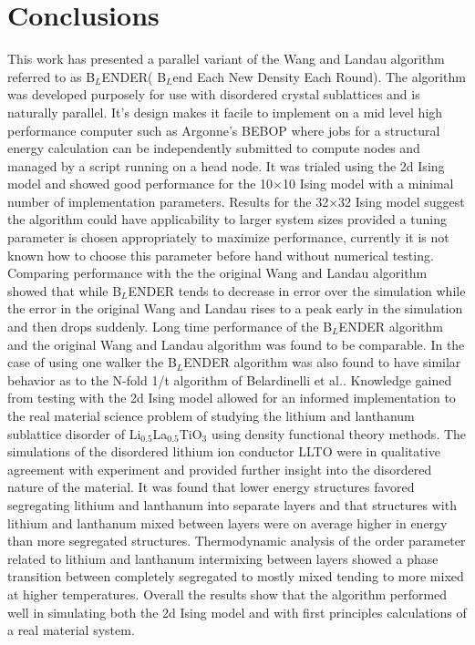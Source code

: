 \documentclass[aps,pre,reprint,superscriptaddress,showkeys]{revtex4-1}
\begin{document}
\section{Conclusions}
\label{sec5}
 This work has presented a parallel variant of the Wang and Landau algorithm referred to as B$_L$ENDER( B$_L$end Each New Density Each Round). The algorithm was developed purposely for use with disordered crystal sublattices and is naturally parallel. It's design makes it facile to implement on a mid level high performance computer such as Argonne's BEBOP where jobs for a structural energy calculation can be independently submitted to compute nodes  and managed by a script running on a head node. It was trialed using the 2d Ising model and showed good performance for the 10$\times$10 Ising model with a minimal number of implementation parameters. Results for the 32$\times$32 Ising model suggest the algorithm could have applicability to larger system sizes provided a tuning parameter is chosen appropriately to maximize performance, currently it is not known how to choose this parameter before hand without numerical testing. Comparing performance with the the original Wang and Landau algorithm showed that while B$_L$ENDER tends to decrease in error over the simulation while the error in the original Wang and Landau rises to a peak early in the simulation and then drops suddenly. Long time performance of the B$_L$ENDER algorithm and the original Wang and Landau algorithm was found to be comparable.  In the case of using one walker the B$_L$ENDER algorithm was also found to have similar behavior as to the N-fold 1/t algorithm of Belardinelli et al.\cite{saturation}. Knowledge gained from testing with the 2d Ising model allowed for an informed implementation to the real material science problem of studying the lithium and lanthanum sublattice disorder of Li$_{0.5}$La$_{0.5}$TiO$_{3}$ using density functional theory methods. The simulations of the disordered lithium ion conductor LLTO were in qualitative agreement with experiment and provided further insight into the disordered nature of the material. It was found that lower energy structures favored segregating lithium and lanthanum into separate layers and that structures with lithium and lanthanum mixed between layers were on average higher in energy than more segregated structures. Thermodynamic analysis of the order parameter related to lithium and lanthanum intermixing between layers showed a phase transition between completely segregated  to mostly mixed tending to more mixed at higher temperatures. Overall the results show that the algorithm performed well in simulating both the 2d Ising model and with first principles calculations of a real material system. 
\end{document}
